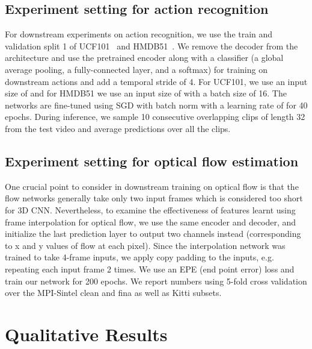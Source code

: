 \documentclass[10pt,twocolumn,letterpaper]{article}
\begin{document}
\begin{table*}[!t]
\subsection{Experiment setting for action recognition}
\label{appendix:action_recognition}

For downstream experiments on action recognition, we use the train and validation split 1 of UCF101~\cite{UCF101} and HMDB51~\cite{kuehne2011hmdb}. We remove the decoder from the architecture and use the pretrained encoder along with a classifier (a global average pooling, a fully-connected layer, and a softmax) for training on downstream actions and add a temporal stride of 4. For UCF101, we use an input size of  and for HMDB51 we use an input size of  with a batch size of 16. The networks are fine-tuned using SGD with batch norm with a learning rate of  for 40 epochs. During inference, we sample 10 consecutive overlapping clips of length 32 from the test video and average predictions over all the clips.



\subsection{Experiment setting for optical flow estimation}
\label{appendix:flow_estimation}

One crucial point to consider in downstream training on optical flow is that the flow networks generally take only two input frames which is considered too short for 3D CNN. Nevertheless, to examine the effectiveness of features learnt using frame interpolation for optical flow, we use the same encoder and decoder, and initialize the last prediction layer to output two channels instead (corresponding to x and y values of flow at each pixel). Since the interpolation network was trained to take 4-frame inputs, we apply copy padding to the inputs, e.g. repeating each input frame 2 times. We use an EPE (end point error) loss and train our network for 200 epochs. We report numbers using 5-fold cross validation over the MPI-Sintel clean and fina as well as Kitti subsets.

\section{Qualitative Results}
\label{appendix:qual}





\end{table*}
\end{document}
